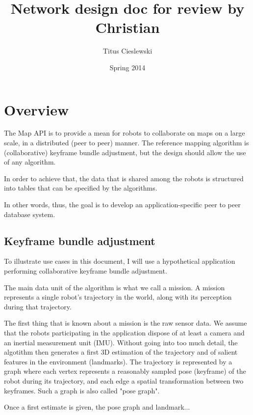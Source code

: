 \documentclass{article}
\title{Network design doc for review by Christian}
\author{Titus Cieslewski}
\date{Spring 2014}
\begin{document}
\maketitle

\section{Overview}

The Map API is to provide a mean for robots to collaborate on maps on a large
scale, in a distributed (peer to peer) manner. The reference mapping algorithm
is (collaborative) keyframe bundle adjustment, but the design should allow the 
use of any algorithm.

In order to achieve that, the data that is shared among the robots is structured
into tables that can be specified by the algorithms.

In other words, thus, the goal is to develop an application-specific peer to
peer database system.

\subsection{Keyframe bundle adjustment}

To illustrate use cases in this document, I will use a hypothetical application
performing collaborative keyframe bundle adjustment. 

The main data unit of the algorithm is what we call a mission. A mission
represents a single robot's trajectory in the world, along with its perception
during that trajectory.

The first thing that is known about a mission is the raw sensor data. We assume
that the robots participating in the application dispose of at least a camera
and an inertial measurement unit (IMU). Without going into too much detail, the
algotithm then generates a first 3D estimation of the trajectory and of salient
features in the environment (landmarks). The trajectory is represented by a
graph where each vertex represents a reasonably sampled pose (keyframe) of the
robot during its trajectory, and each edge a spatial transformation between two 
keyframes. Such a graph is also called "pose graph".

Once a first estimate is given, the pose graph and landmark...
\end{document}
